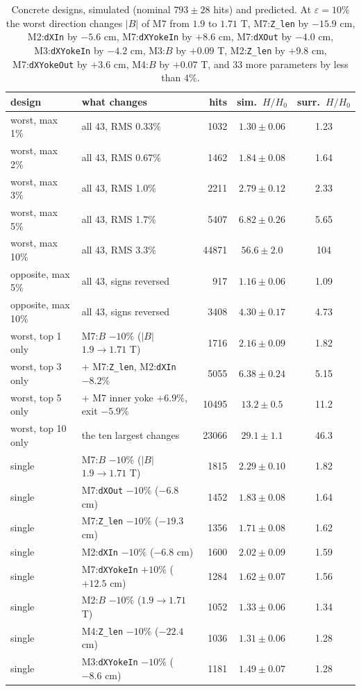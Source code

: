 \documentclass[11pt,a4paper]{article}
\newcommand{\HH}{H/H_0}
\begin{document}
\begin{table}[t]
\centering
\caption{Concrete designs, simulated (nominal $793\pm28$ hits) and predicted. At
$\varepsilon=10\%$ the worst direction changes $|B|$ of M7 from $1.9$ to $1.71$ T, M7:\texttt{Z\_len}
by $-15.9$ cm, M2:\texttt{dXIn} by $-5.6$ cm, M7:\texttt{dXYokeIn} by $+8.6$ cm, M7:\texttt{dXOut} by
$-4.0$ cm, M3:\texttt{dXYokeIn} by $-4.2$ cm, M3:$B$ by $+0.09$ T, M2:\texttt{Z\_len} by $+9.8$ cm,
M7:\texttt{dXYokeOut} by $+3.6$ cm, M4:$B$ by $+0.07$ T, and 33 more parameters by less than $4\%$.}
\label{tab:concrete}
\small
\begin{tabular}{llrcc}
\toprule
design & what changes & hits & sim.\ $\HH$ & surr.\ $\HH$ \\
\midrule
worst, max 1\%   & all 43, RMS 0.33\% & 1032  & $1.30\pm0.06$ & 1.23 \\
worst, max 2\%   & all 43, RMS 0.67\% & 1462  & $1.84\pm0.08$ & 1.64 \\
worst, max 3\%   & all 43, RMS 1.0\% & 2211  & $2.79\pm0.12$ & 2.33 \\
worst, max 5\%   & all 43, RMS 1.7\% & 5407  & $6.82\pm0.26$ & 5.65 \\
worst, max 10\%  & all 43, RMS 3.3\% & 44871 & $56.6\pm2.0$  & 104 \\
opposite, max 5\% & all 43, signs reversed & 917 & $1.16\pm0.06$ & 1.09 \\
opposite, max 10\% & all 43, signs reversed & 3408 & $4.30\pm0.17$ & 4.73 \\
\midrule
worst, top 1 only  & M7:$B$ $-10\%$ ($|B|$ $1.9\to1.71$ T) & 1716 & $2.16\pm0.09$ & 1.82 \\
worst, top 3 only  & + M7:\texttt{Z\_len}, M2:\texttt{dXIn} $-8.2\%$ & 5055 & $6.38\pm0.24$ & 5.15 \\
worst, top 5 only  & + M7 inner yoke $+6.9\%$, exit $-5.9\%$ & 10495 & $13.2\pm0.5$ & 11.2 \\
worst, top 10 only & the ten largest changes & 23066 & $29.1\pm1.1$ & 46.3 \\
\midrule
single & M7:$B$ $-10\%$ ($|B|$ $1.9\to1.71$ T) & 1815 & $2.29\pm0.10$ & 1.82 \\
single & M7:\texttt{dXOut} $-10\%$ ($-6.8$ cm)  & 1452 & $1.83\pm0.08$ & 1.64 \\
single & M7:\texttt{Z\_len} $-10\%$ ($-19.3$ cm) & 1356 & $1.71\pm0.08$ & 1.62 \\
single & M2:\texttt{dXIn} $-10\%$ ($-6.8$ cm)   & 1600 & $2.02\pm0.09$ & 1.59 \\
single & M7:\texttt{dXYokeIn} $+10\%$ ($+12.5$ cm) & 1284 & $1.62\pm0.07$ & 1.56 \\
single & M2:$B$ $-10\%$ ($1.9\to1.71$ T) & 1052 & $1.33\pm0.06$ & 1.34 \\
single & M4:\texttt{Z\_len} $-10\%$ ($-22.4$ cm) & 1036 & $1.31\pm0.06$ & 1.28 \\
single & M3:\texttt{dXYokeIn} $-10\%$ ($-8.6$ cm) & 1181 & $1.49\pm0.07$ & 1.28 \\
\bottomrule
\end{tabular}
\end{table}
\end{document}
